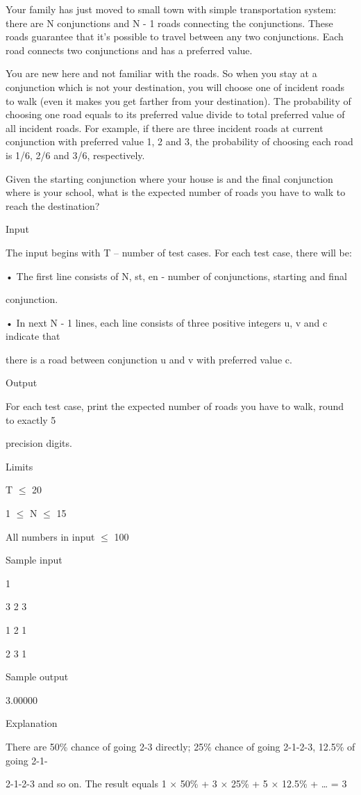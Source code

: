 



   Your family has just moved to small town with simple transportation system: there are N conjunctions and N - 1 roads connecting the conjunctions. These roads guarantee that it’s possible to travel between any two conjunctions. Each road connects two conjunctions and has a preferred value.  




   You are new here and not familiar with the roads. So when you stay at a conjunction which is not your destination, you will choose one of incident roads to walk (even it makes you get farther from your destination). The probability of choosing one road equals to its preferred value divide to total preferred value of all incident roads. For example, if there are three incident roads at current conjunction with preferred value 1, 2 and 3, the probability of choosing each road is 1/6, 2/6 and 3/6, respectively.  




   Given the starting conjunction where your house is and the final conjunction where is your school, what is the expected number of roads you have to walk to reach the destination?  




   Input   


   The input begins with T – number of test cases. For each test case, there will be:   


   • The first line consists of N, st, en - number of conjunctions, starting and final   


   conjunction.   


   • In next N - 1 lines, each line consists of three positive integers u, v and c indicate that   


   there is a road between conjunction u and v with preferred value c.  




   Output   


   For each test case, print the expected number of roads you have to walk, round to exactly 5   


   precision digits.  




   Limits   


   T  $\le$  20   


   1  $\le$  N  $\le$  15   


   All numbers in input  $\le$  100  




   Sample input   


   1   


   3 2 3   


   1 2 1   


   2 3 1  




   Sample output   


   3.00000  




   Explanation   


   There are 50\% chance of going 2-3 directly; 25\% chance of going 2-1-2-3, 12.5\% of going 2-1-   


   2-1-2-3 and so on. The result equals 1 × 50\% + 3 × 25\% + 5 × 12.5\% + … = 3  
